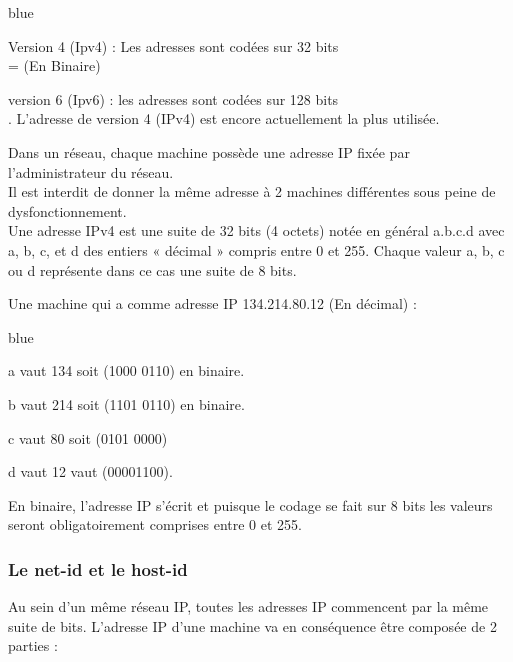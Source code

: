 \begin{items}{blue}{\Bullet}
	\item Version 4 (Ipv4) : Les adresses sont codées sur 32 bits \\
		
		=  (En Binaire)
	\item version 6 (Ipv6)	: les adresses sont codées sur 128 bits \\
	. 
	L’adresse de version 4 (IPv4) est encore actuellement la plus utilisée. 
\end{items}

Dans un réseau, chaque machine possède une adresse IP fixée par l'administrateur du réseau. \\
Il est interdit de donner la même adresse à 2 machines différentes sous peine de dysfonctionnement.\\

Une adresse IPv4 est une suite de 32 bits (4 octets)  notée en général a.b.c.d avec a, b, c, et d des entiers « décimal » 
compris entre 0 et 255.
 Chaque valeur a, b, c ou d représente dans ce cas une suite de 8 bits. 

 \begin{exemple}
Une machine qui a comme adresse IP 134.214.80.12 (En décimal) :

\begin{items}{blue}{\Bullet}
\item a vaut 134 soit (1000 0110) en binaire.
\item b vaut 214 soit (1101 0110) en binaire. 
\item c vaut 80 soit (0101 0000) 
\item d vaut 12 vaut (00001100).
\end{items}

En binaire, l'adresse IP s'écrit   et puisque le codage se fait sur 
8 bits les valeurs seront obligatoirement comprises entre 0 et 255.
\end{exemple}

\subsubsection{Le net-id et le host-id}

Au sein d'un même réseau IP, toutes les adresses IP commencent par la même suite de bits.
L’adresse IP d’une machine va en conséquence être composée de 2 parties : 

